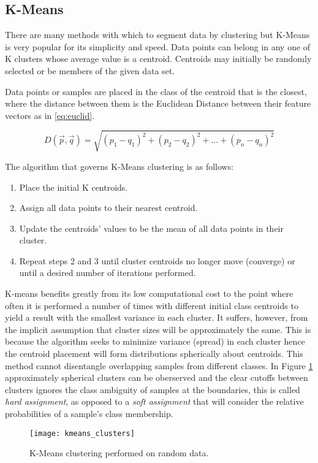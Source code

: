 \subsection{K-Means}
There are many methods with which to segment data by clustering but K-Means is very popular for its simplicity and speed. Data points can belong in any one of K clusters whose average value is a centroid. Centroids may initially be randomly selected or be members of the given data set. 

Data points or samples are placed in the class of the centroid that is the closest, where the distance between them is the Euclidean Distance between their feature vectors as in \ref{eq:euclid}. 

\begin{equation}
    D(\vec{p},\vec{q}) = \sqrt{(p_1 - q_1)^2 + (p_2 - q_2)^2 +\hdots + (p_n - q_n)^2}
    \label{eq:euclid}
\end{equation} 

The algorithm that governs K-Means clustering is as follows:
    \begin{enumerate}
    \itemsep0em
        \item Place the initial K centroids.
        \item Assign all data points to their nearest centroid.
        \item Update the centroids' values to be the mean of all data points in their cluster.
        \item Repeat steps 2 and 3 until cluster centroids no longer move (converge) or until a desired number of iterations performed. 
    \end{enumerate}

K-means benefits greatly from its low computational cost to the point where often it is performed a number of times with different initial class centroids to yield a result with the smallest variance in each cluster. It suffers, however, from the implicit assumption that cluster sizes will be approximately the same. This is because the algorithm seeks to minimize variance (spread) in each cluster hence the  centroid placement will form distributions spherically about centroids. This method cannot disentangle overlapping samples from different classes. In Figure \ref{fig:clusters} approximately spherical clusters can be oberserved and the clear cutoffs between clusters ignores the class ambiguity of samples at the boundaries, this is called \emph{hard assignment}, as opposed to a \emph{soft assignment} that will consider the relative probabilities of a sample's class membership. 



\begin{figure}[H]
    \centering
    \centering\texttt{[image: kmeans\_clusters]}
    \caption{K-Means clustering performed on random data.}
    \label{fig:clusters}
\end{figure} 